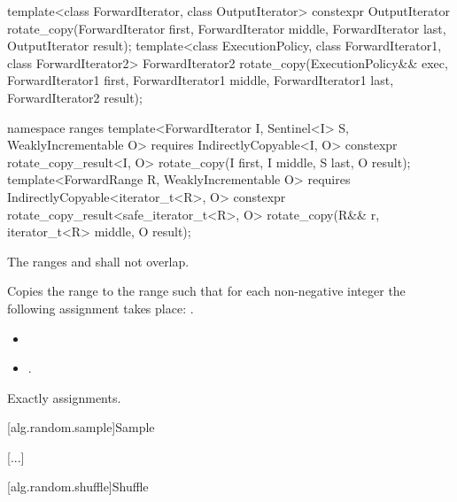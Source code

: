 %
\begin{itemdecl}
template<class ForwardIterator, class OutputIterator>
  constexpr OutputIterator
    rotate_copy(ForwardIterator first, ForwardIterator middle, ForwardIterator last,
                OutputIterator result);
template<class ExecutionPolicy, class ForwardIterator1, class ForwardIterator2>
  ForwardIterator2
    rotate_copy(ExecutionPolicy&& exec,
                ForwardIterator1 first, ForwardIterator1 middle, ForwardIterator1 last,
                ForwardIterator2 result);
\end{itemdecl}
\begin{addedblock}
\begin{itemdecl}
namespace ranges {
  template<ForwardIterator I, Sentinel<I> S, WeaklyIncrementable O>
    requires IndirectlyCopyable<I, O>
    constexpr rotate_copy_result<I, O>
      rotate_copy(I first, I middle, S last, O result);
  template<ForwardRange R, WeaklyIncrementable O>
    requires IndirectlyCopyable<iterator_t<R>, O>
    constexpr rotate_copy_result<safe_iterator_t<R>, O>
      rotate_copy(R&& r, iterator_t<R> middle, O result);
}
\end{itemdecl}
\end{addedblock}

\begin{itemdescr}
\pnum
\requires
The ranges
and
shall not overlap.

\pnum
\effects
Copies the range
to the range
such that for each non-negative integer
the following assignment takes place:
.

\pnum
\returns
\begin{itemize}
\item {} 
\item {}.
\end{itemize}

\pnum
\complexity
Exactly
assignments.
\end{itemdescr}


[alg.random.sample]{Sample}

[...]

[alg.random.shuffle]{Shuffle}

